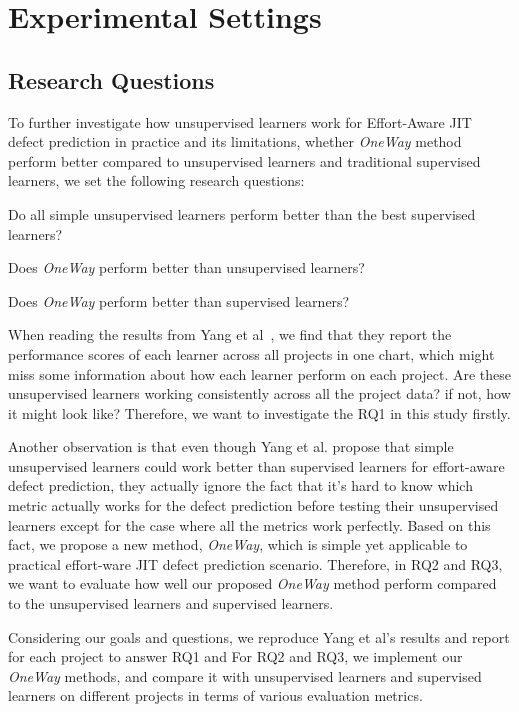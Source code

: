 \section{Experimental Settings}

\subsection{Research Questions}
To further investigate how unsupervised learners work for 
Effort-Aware JIT defect prediction in practice and its limitations,
whether {\it OneWay} method perform better compared to unsupervised learners and traditional
supervised learners, we set the following research questions:
\bi 
\item Do all simple unsupervised learners perform better than the best supervised learners?
\item Does {\it OneWay} perform  better than unsupervised learners?
\item Does {\it OneWay} perform  better than supervised learners?
\ei

When reading the results from Yang et al~\cite{yang2016effort},
we find that they report the performance scores of each learner across all projects in one chart, which might miss some information about how each learner perform on each project. Are these unsupervised learners working consistently across all the project data? if not, how it might look like? Therefore, we want to investigate the RQ1 in this study firstly.

Another observation is that even though Yang et al. propose that 
simple unsupervised learners could work better than supervised learners for effort-aware defect prediction, they actually ignore the fact that it's hard to know which metric actually works for the defect prediction before testing their unsupervised learners except for the case where all the metrics work perfectly. Based on this fact, we propose a new method, {\it OneWay}, which is simple yet applicable to practical effort-ware
JIT defect prediction scenario. Therefore,
in RQ2 and RQ3, we want to evaluate how well our proposed {\it OneWay} method perform compared to the unsupervised learners and supervised learners.

Considering our goals and questions, we reproduce Yang et al's results
and report for each project to answer RQ1 and For RQ2 and RQ3, we implement our {\it OneWay}
methods, and compare it with unsupervised learners and supervised learners on different projects in terms of various evaluation metrics.

